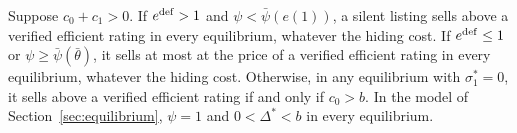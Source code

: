 \label{cor:att_ordering}
Suppose $c_0+c_1>0$. If $e^{\rm def}>1$ and $\psi<\bar\psi(e(1))$, a silent listing sells above a verified efficient rating in every equilibrium, whatever the hiding cost. If $e^{\rm def}\le1$ or $\psi\ge\bar\psi(\bar\theta)$, it sells at most at the price of a verified efficient rating in every equilibrium, whatever the hiding cost. Otherwise, in any equilibrium with $\sigma_1^*=0$, it sells above a verified efficient rating if and only if $c_0>b$. In the model of Section~\ref{sec:equilibrium}, $\psi=1$ and $0<\Delta^*<b$ in every equilibrium.
